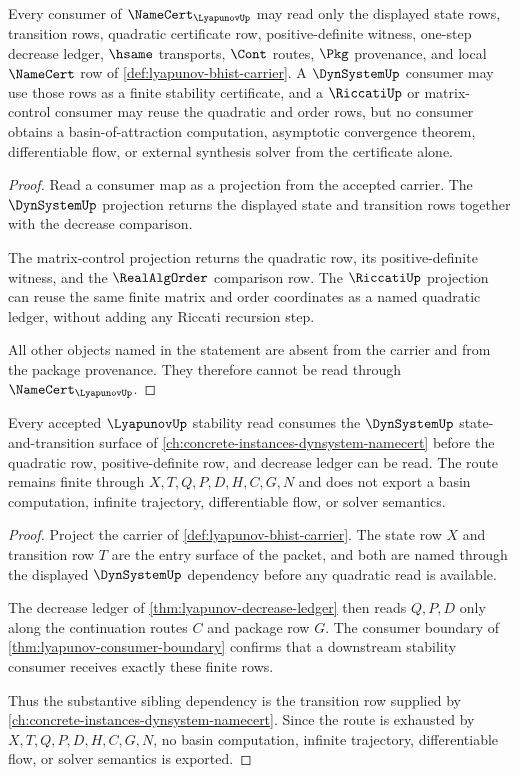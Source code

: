 \begin{theorem}
\label{thm:lyapunov-consumer-boundary}
Every consumer of $\NameCert_{\LyapunovUp}$ may read only the displayed state
rows, transition rows, quadratic certificate row, positive-definite witness,
one-step decrease ledger, $\hsame$ transports, $\Cont$ routes, $\Pkg$
provenance, and local $\NameCert$ row of
\autoref{def:lyapunov-bhist-carrier}. A $\DynSystemUp$ consumer may use those
rows as a finite stability certificate, and a $\RiccatiUp$ or matrix-control
consumer may reuse the quadratic and order rows, but no consumer obtains a
basin-of-attraction computation, asymptotic convergence theorem, differentiable
flow, or external synthesis solver from the certificate alone.
\end{theorem}
\begin{proof}
Read a consumer map as a projection from the accepted carrier. The
$\DynSystemUp$ projection returns the displayed state and transition rows
together with the decrease comparison.

The matrix-control projection returns the quadratic row, its positive-definite
witness, and the $\RealAlgOrder$ comparison row. The $\RiccatiUp$ projection
can reuse the same finite matrix and order coordinates as a named quadratic
ledger, without adding any Riccati recursion step.

All other objects named in the statement are absent from the carrier and from
the package provenance. They therefore cannot be read through
$\NameCert_{\LyapunovUp}$.
\end{proof}

\begin{theorem}
\label{thm:lyapunov-dynsystem-sibling-route}
Every accepted $\LyapunovUp$ stability read consumes the $\DynSystemUp$ state-and-transition surface of \autoref{ch:concrete-instances-dynsystem-namecert} before the quadratic row, positive-definite row, and decrease ledger can be read. The route remains finite through $X,T,Q,P,D,H,C,G,N$ and does not export a basin computation, infinite trajectory, differentiable flow, or solver semantics.
\end{theorem}
\begin{proof}
Project the carrier of \autoref{def:lyapunov-bhist-carrier}. The state row $X$ and transition row $T$ are the entry surface of the packet, and both are named through the displayed $\DynSystemUp$ dependency before any quadratic read is available.

The decrease ledger of \autoref{thm:lyapunov-decrease-ledger} then reads $Q,P,D$ only along the continuation routes $C$ and package row $G$. The consumer boundary of \autoref{thm:lyapunov-consumer-boundary} confirms that a downstream stability consumer receives exactly these finite rows.

Thus the substantive sibling dependency is the transition row supplied by \autoref{ch:concrete-instances-dynsystem-namecert}. Since the route is exhausted by $X,T,Q,P,D,H,C,G,N$, no basin computation, infinite trajectory, differentiable flow, or solver semantics is exported.
\end{proof}

